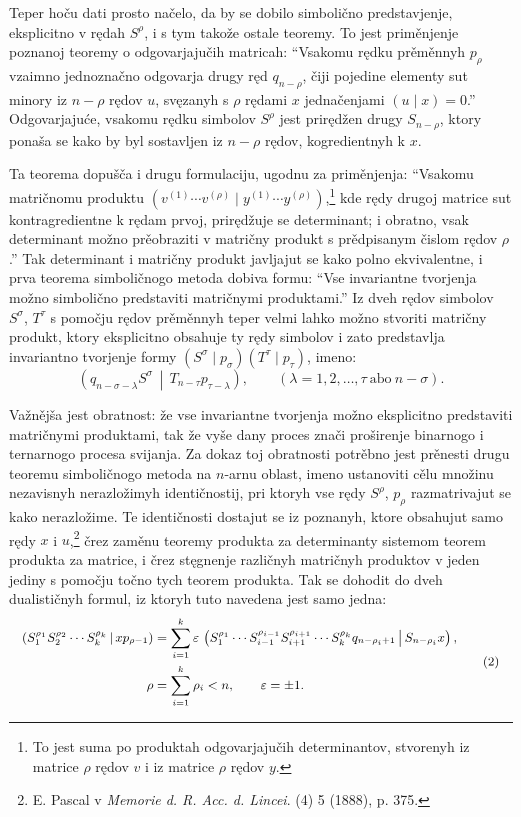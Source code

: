 \documentclass[11pt]{article}
\newcommand{\eps}{\varepsilon}
\newcommand{\pair}[2]{\left(#1\,\middle|\,#2\right)}
\begin{document}
Teper hoču dati prosto načelo, da by se dobilo simbolično predstavjenje, eksplicitno v rędah $S^\rho$, i s tym takože ostale teoremy. To jest priměnjenje poznanoj teoremy o odgovarjajučih matricah: ``Vsakomu rędku prěměnnyh $p_\rho$ vzaimno jednoznačno odgovarja drugy ręd $q_{n-\rho}$, čiji pojedine elementy sut minory iz $n-\rho$ rędov $u$, svęzanyh s $\rho$ rędami $x$ jednačenjami $(u\mid x)=0$.'' Odgovarjajuće, vsakomu rędku simbolov $S^\rho$ jest prirędžen drugy $S_{n-\rho}$, ktory ponaša se kako by byl sostavljen iz $n-\rho$ rędov, kogredientnyh k $x$.

Ta teorema dopušča i drugu formulaciju, ugodnu za priměnjenja: ``Vsakomu matričnomu produktu $(v^{(1)}\cdots v^{(\rho)}\mid y^{(1)}\cdots y^{(\rho)})$,\footnote{To jest suma po produktah odgovarjajučih determinantov, stvorenyh iz matrice $\rho$ rędov $v$ i iz matrice $\rho$ rędov $y$.} kde rędy drugoj matrice sut kontragredientne k rędam prvoj, prirędžuje se determinant; i obratno, vsak determinant možno prěobraziti v matričny produkt s prědpisanym čislom rędov $\rho$.'' Tak determinant i matričny produkt javljajut se kako polno ekvivalentne, i prva teorema simboličnogo metoda dobiva formu: ``Vse invariantne tvorjenja možno simbolično predstaviti matričnymi produktami.'' Iz dveh rędov simbolov $S^\sigma$, $T^\tau$ s pomočju rędov prěměnnyh teper velmi lahko možno stvoriti matričny produkt, ktory eksplicitno obsahuje ty rędy simbolov i zato predstavlja invariantno tvorjenje formy $(S^\sigma\mid p_\sigma)(T^\tau\mid p_\tau)$, imeno:
\begin{equation}
 \pair{q_{n-\sigma-\lambda}S^\sigma}{T_{n-\tau}p_{\tau-\lambda}},
 \qquad (\lambda=1,2,\ldots,\tau\ \text{abo}\ n-\sigma).
\tag{1}
\end{equation}

Važnějša jest obratnost: že vse invariantne tvorjenja možno eksplicitno predstaviti matričnymi produktami, tak že vyše dany proces znači proširenje binarnogo i ternarnogo procesa svijanja. Za dokaz toj obratnosti potrěbno jest prěnesti drugu teoremu simboličnogo metoda na $n$-arnu oblast, imeno ustanoviti cělu množinu nezavisnyh nerazložimyh identičnostij, pri ktoryh vse rędy $S^\rho$, $p_\rho$ razmatrivajut se kako nerazložime. Te identičnosti dostajut se iz poznanyh, ktore obsahujut samo rędy $x$ i $u$,\footnote{E. Pascal v \emph{Memorie d. R. Acc. d. Lincei}. (4) 5 (1888), p. 375.} črez zaměnu teoremy produkta za determinanty sistemom teorem produkta za matrice, i črez stęgnenje različnyh matričnyh produktov v jeden jediny s pomočju točno tych teorem produkta. Tak se dohodit do dveh dualističnyh formul, iz ktoryh tuto navedena jest samo jedna:
\begin{equation}
\small
\begin{aligned}
 \pair{S_1^{\rho_1}S_2^{\rho_2}\cdots S_k^{\rho_k}}{x p_{\rho-1}}
 &=\sum_{i=1}^{k}\eps\,\pair{S_1^{\rho_1}\cdots S_{i-1}^{\rho_{i-1}}S_{i+1}^{\rho_{i+1}}\cdots S_k^{\rho_k}q_{n-\rho_i+1}}{S_{n-\rho_i}x},\\
 \rho&=\sum_{i=1}^{k}\rho_i<n,\qquad \eps=\pm1.
\end{aligned}
\tag{2}
\end{equation}
\end{document}
